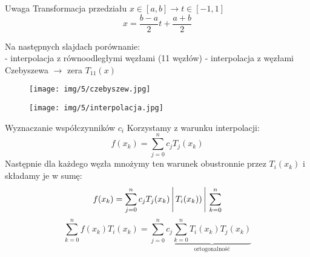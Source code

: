 \begin{frame}
    \begin{block}{Uwaga}
        Transformacja przedziału $x \in [a,b] \rightarrow t \in [-1,1]$
        $$x=\frac{b-a}{2}t+\frac{a+b}{2}$$
    \end{block}
    Na następnych slajdach porównanie:\\
     - interpolacja z równoodległymi węzłami (11 węzłów)\newline
    - interpolacja z węzłami Czebyszewa $\rightarrow$ zera $T_{11}(x)$
\end{frame}
\begin{frame}
    \begin{figure}
        \texttt{[image: img/5/czebyszew.jpg]}
    \end{figure}
\end{frame}
\begin{frame}
    \begin{figure}
        \texttt{[image: img/5/interpolacja.jpg]}
    \end{figure}
\end{frame}
\begin{frame}{Wyznaczanie współczynników $c_i$}
Korzystamy z warunku interpolacji:
	$$f(x_k)= \sum_{j=0}^{n}c_jT_j(x_k)$$
	Następnie dla każdego węzła mnożymy ten warunek obustronnie przez $T_i(x_k)$ i składamy je w sumę:
	$$f(x_k)= \sum_{j=0}^{n}c_jT_j(x_k)\Bigg\arrowvert T_i(x_k)) \Bigg\arrowvert \sum_{k=0}^{n}$$
    $$\sum_{k=0}^{n}f(x_k)T_i(x_k)=\sum_{j=0}^{n}c_j\underbrace{\sum_{k=0}^{n}T_i(x_k)T_j(x_k)}_{\text{ortogonalność}}$$
\end{frame}
